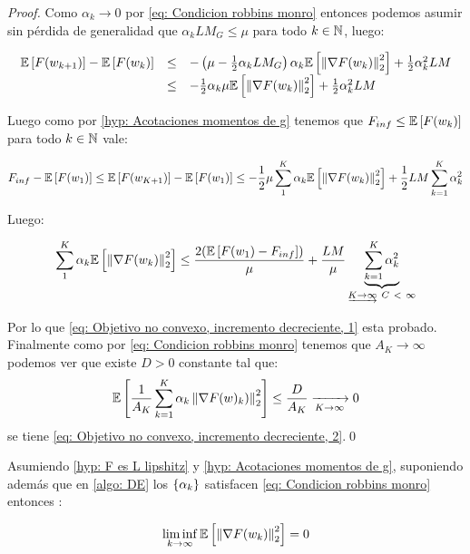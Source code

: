 \begin{proof}
	Como $\alpha_k \rightarrow 0$ por \ref{eq: Condicion robbins monro} entonces podemos asumir sin p\'erdida de generalidad que $\alpha_k L M_G \leq \mu$ para todo $k \in {\mathbb{N}}$, luego:
	
		\begin{equation*}
	\begin{array}{rcl}
	\mathbb{E} \left[F(w_{k+1})\right] - \mathbb{E} \left[F(w_k)\right] & \leq & - \left(\mu - \frac{1}{2}\alpha_k L M_G \right) \alpha_k \mathbb{E} \left[\left\lVert\nabla F(w_k)\right\rVert_2^2\right] + \frac{1}{2} \alpha_k^2 LM \\
	& \leq & - \frac{1}{2}\alpha_k \mu \mathbb{E} \left[\left\lVert\nabla F(w_k)\right\rVert_2^2\right] + \frac{1}{2} \alpha_k^2 LM
	\end{array}
	\end{equation*}
	
	Luego como por \ref{hyp: Acotaciones momentos de g} tenemos que $F_{inf} \leq \mathbb{E} \left[F(w_k)\right]$ para todo $k \in {\mathbb{N}}$ vale:
	
	\begin{equation*}
	F_{inf} - \mathbb{E} \left[F(w_1)\right] \leq \mathbb{E} \left[F(w_{K+1})\right] - \mathbb{E} \left[F(w_1)\right] \leq  - \frac{1}{2}\mu \sum\limits_{1}^{K}{\alpha_k \mathbb{E} \left[\left\lVert\nabla F(w_k)\right\rVert_2^2\right]} + \frac{1}{2} LM \sum\limits_{k=1}^{K} {\alpha_k^2}
	\end{equation*}
	
	Luego:
	
		\begin{equation*}
	\sum\limits_{1}^{K}{\alpha_k \expectation{\norm{\nabla F(w_k)}_2^2}}  \leq  \dfrac{2 (\expectation{F(w_1) - F_{inf} })}{\mu} + \frac{LM}{\mu}  \underbrace{\sum\limits_{k=1}^{K} {\alpha_k^2}}_{\underrightarrow{K \rightarrow \infty} \ C  \ < \ \infty }
	\end{equation*}
	
	Por lo que \ref{eq: Objetivo no convexo, incremento decreciente, 1} esta probado. Finalmente como por \ref{eq: Condicion robbins monro} tenemos que $A_K \rightarrow \infty$ podemos ver que existe $D>0$ constante tal que:
	\begin{equation*}
	\mathbb{E} \left[\dfrac{1}{A_K}\sum\limits_{k=1}^{K} {\alpha_k \left\lVert\nabla F (w)_k)\right\rVert_2^2}\right] \leq \dfrac{D}{A_K} \xrightarrow[K \rightarrow \infty]{} 0
	\end{equation*}
	se tiene \ref{eq: Objetivo no convexo, incremento decreciente, 2}.\qed
	
\end{proof}

\begin{corollary}
	\label{coro: Gradientes cerca de cero, Objetivo no convexo, Incrementos decrecientes}
	Asumiendo \ref{hyp: F es L lipshitz} y \ref{hyp: Acotaciones momentos de g}, suponiendo adem\'as que en \ref{algo: DE} los $\left\lbrace\alpha_k\right\rbrace$ satisfacen \ref{eq: Condicion robbins monro} entonces : 
	
	\begin{equation}
		\liminf\limits_{k \rightarrow \infty} {\mathbb{E} \left[\left\lVert\nabla F (w_k)\right\rVert_2^2\right]} = 0 
	\end{equation}
	
\end{corollary}

